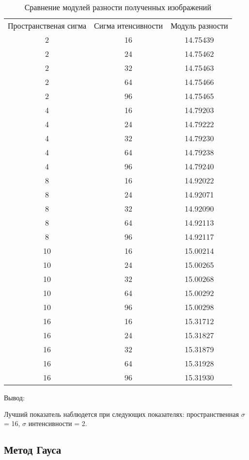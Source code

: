 \begin{table}[H]
	\caption{Сравнение модулей разности полученных изображений}
	\label{tabular:timesandtenses}
	\begin{center}
		\begin{tabular}{ccc}
			Пространственая сигма & Сигма итенсивности & Модуль разности \\
			2 & 16 & 14.75439 \\
			2 & 24 & 14.75462 \\
			2 & 32 & 14.75463 \\
			2 & 64 & 14.75466 \\
			2 & 96 & 14.75465 \\
			4 & 16 & 14.79203 \\
			4 & 24 & 14.79222 \\
			4 & 32 & 14.79230 \\
			4 & 64 & 14.79238 \\
			4 & 96 & 14.79240 \\
			8 & 16 & 14.92022 \\
			8 & 24 & 14.92071 \\
			8 & 32 & 14.92090 \\
			8 & 64 & 14.92113 \\
			8 & 96 & 14.92117 \\
			10 & 16 & 15.00214 \\
			10 & 24 & 15.00265 \\
			10 & 32 & 15.00268 \\
			10 & 64 & 15.00292 \\
			10 & 96 & 15.00298 \\
			16 & 16 & 15.31712 \\
			16 & 24 & 15.31827 \\
			16 & 32 & 15.31879 \\
			16 & 64 & 15.31928 \\
			16 & 96 & 15.31930 \\
		\end{tabular}
	\end{center}
\end{table}

Вывод:

Лучший показатель наблюдется при следующих показателях: пространственная $\sigma$ = 16, $\sigma$ интенсивности = 2.


\subsection{Метод Гауса}

